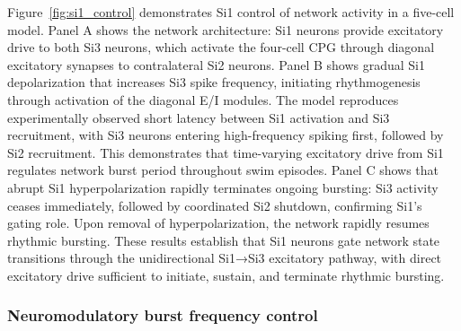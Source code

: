 \documentclass[nofootinbib,aip,amsmath,amssymb,preprint,twocolumn,floatfix,10pt]{revtex4-2}
\begin{document}
Figure~\ref{fig:si1_control} demonstrates Si1 control of network activity in a five-cell model. Panel A shows the network architecture: Si1 neurons provide excitatory drive to both Si3 neurons, which activate the four-cell CPG through diagonal excitatory synapses to contralateral Si2 neurons. Panel B shows gradual Si1 depolarization that increases Si3 spike frequency, initiating rhythmogenesis through activation of the diagonal E/I modules. The model reproduces experimentally observed short latency between Si1 activation and Si3 recruitment, with Si3 neurons entering high-frequency spiking first, followed by Si2 recruitment. This demonstrates that time-varying excitatory drive from Si1 regulates network burst period throughout swim episodes. Panel C shows that abrupt Si1 hyperpolarization rapidly terminates ongoing bursting: Si3 activity ceases immediately, followed by coordinated Si2 shutdown, confirming Si1's gating role. Upon removal of hyperpolarization, the network rapidly resumes rhythmic bursting. These results establish that Si1 neurons gate network state transitions through the unidirectional Si1→Si3 excitatory pathway, with direct excitatory drive sufficient to initiate, sustain, and terminate rhythmic bursting.

\subsubsection{Neuromodulatory burst frequency control}
\end{document}
